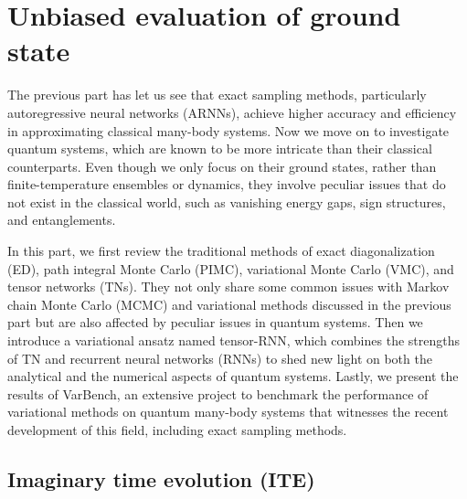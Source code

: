 \chapter{Unbiased evaluation of ground state}
\label{ch:qmc}

The previous part has let us see that exact sampling methods, particularly autoregressive neural networks (ARNNs), achieve higher accuracy and efficiency in approximating classical many-body systems. Now we move on to investigate quantum systems, which are known to be more intricate than their classical counterparts. Even though we only focus on their ground states, rather than finite-temperature ensembles or dynamics, they involve peculiar issues that do not exist in the classical world, such as vanishing energy gaps, sign structures, and entanglements.

In this part, we first review the traditional methods of exact diagonalization (ED), path integral Monte Carlo (PIMC), variational Monte Carlo (VMC), and tensor networks (TNs). They not only share some common issues with Markov chain Monte Carlo (MCMC) and variational methods discussed in the previous part but are also affected by peculiar issues in quantum systems. Then we introduce a variational ansatz named tensor-RNN, which combines the strengths of TN and recurrent neural networks (RNNs) to shed new light on both the analytical and the numerical aspects of quantum systems. Lastly, we present the results of VarBench, an extensive project to benchmark the performance of variational methods on quantum many-body systems that witnesses the recent development of this field, including exact sampling methods.

\section{Imaginary time evolution (ITE)}
\label{sec:ite}

